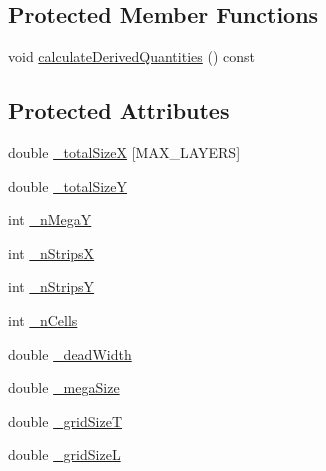 \subsection*{Protected Member Functions}
\begin{DoxyCompactItemize}
\item 
void \hyperlink{class_d_d4hep_1_1_d_d_segmentation_1_1_megatile_layer_grid_x_y_aebab4bf76f81cec67ea1b76c8c95cea6}{calculateDerivedQuantities} () const 
\end{DoxyCompactItemize}
\subsection*{Protected Attributes}
\begin{DoxyCompactItemize}
\item 
double \hyperlink{class_d_d4hep_1_1_d_d_segmentation_1_1_megatile_layer_grid_x_y_aa99372ea774b35c1c17cee61d9afbef2}{\_\-totalSizeX} \mbox{[}MAX\_\-LAYERS\mbox{]}
\item 
double \hyperlink{class_d_d4hep_1_1_d_d_segmentation_1_1_megatile_layer_grid_x_y_a872eaf618286c808f1cb93e7756a6c7c}{\_\-totalSizeY}
\item 
int \hyperlink{class_d_d4hep_1_1_d_d_segmentation_1_1_megatile_layer_grid_x_y_afbd476c007a88c207aa09e12b43c8be7}{\_\-nMegaY}
\item 
int \hyperlink{class_d_d4hep_1_1_d_d_segmentation_1_1_megatile_layer_grid_x_y_a34d0954062dab57ef3ce16b3fc5021fe}{\_\-nStripsX}
\item 
int \hyperlink{class_d_d4hep_1_1_d_d_segmentation_1_1_megatile_layer_grid_x_y_a7d809f0a8f30db5a803be80e2ca833a6}{\_\-nStripsY}
\item 
int \hyperlink{class_d_d4hep_1_1_d_d_segmentation_1_1_megatile_layer_grid_x_y_a5bfd46085fb8a5db80e1333d47230505}{\_\-nCells}
\item 
double \hyperlink{class_d_d4hep_1_1_d_d_segmentation_1_1_megatile_layer_grid_x_y_ab000179caddbb6a3ae67595b9bf87ba4}{\_\-deadWidth}
\item 
double \hyperlink{class_d_d4hep_1_1_d_d_segmentation_1_1_megatile_layer_grid_x_y_af1dd67aeaebfeb9a9c5fbd268df8dbc5}{\_\-megaSize}
\item 
double \hyperlink{class_d_d4hep_1_1_d_d_segmentation_1_1_megatile_layer_grid_x_y_a73e8bf85c016511dedb6a892ef543163}{\_\-gridSizeT}
\item 
double \hyperlink{class_d_d4hep_1_1_d_d_segmentation_1_1_megatile_layer_grid_x_y_a463d0f581c8d384c7ed95cb4e350afd9}{\_\-gridSizeL}
\item 

\end{DoxyCompactItemize}
